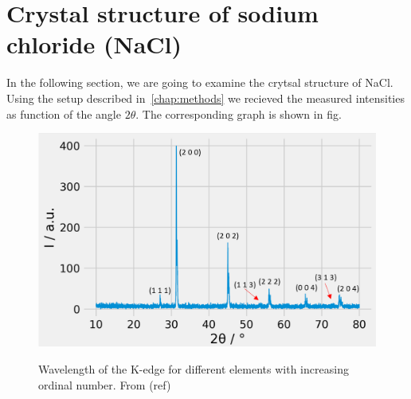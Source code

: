 \section{Crystal structure of sodium chloride (NaCl)}
\label{sec:NaCl}

In the following section, we are going to examine the crytsal structure of NaCl. Using the setup described in~\ref{chap:methods} we recieved the measured intensities as function of the angle $2\theta$. The corresponding graph is shown in fig. 

\begin{figure}[ht]
    \centering
    \includegraphics[angle = 90, width = 0.95\linewidth]{Bilder/Auswertung/NaCl/Ivs2thwIndices.png}
    \label{fig:Elements}
    \caption{Wavelength of the K-edge for different elements with increasing ordinal number. From (ref)}
\end{figure}
